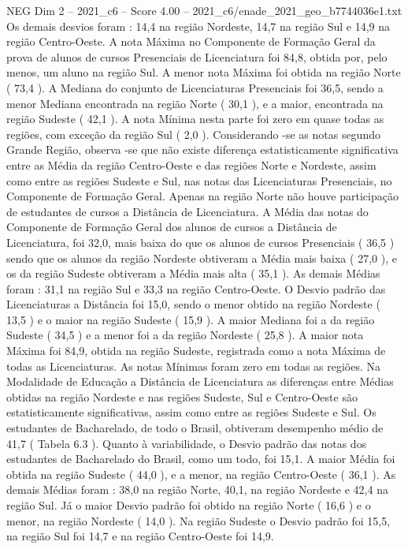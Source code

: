 \begin{textsample}{NEG Dim 2 – 2021\_c6 – Score 4.00 – 2021\_c6/enade\_2021\_geo\_b7744036e1.txt}
Os demais desvios foram : 14,4 na região Nordeste, 14,7 na região Sul e 14,9 na região Centro-Oeste.
A nota Máxima no Componente de Formação Geral da prova de alunos de cursos Presenciais de Licenciatura foi 84,8, obtida por, pelo menos, um aluno na região Sul.
A menor nota Máxima foi obtida na região Norte ( 73,4 ).
A Mediana do conjunto de Licenciaturas Presenciais foi 36,5, sendo a menor Mediana encontrada na região Norte ( 30,1 ), e a maior, encontrada na região Sudeste ( 42,1 ).
A nota Mínima nesta parte foi zero em quase todas as regiões, com exceção da região Sul ( 2,0 ).
Considerando -se as notas segundo Grande Região, observa -se que não existe diferença estatisticamente significativa entre as Média da região Centro-Oeste e das regiões Norte e Nordeste, assim como entre as regiões Sudeste e Sul, nas notas das Licenciaturas Presenciais, no Componente de Formação Geral.
Apenas na região Norte não houve participação de estudantes de cursos a Distância de Licenciatura.
A Média das notas do Componente de Formação Geral dos alunos de cursos a Distância de Licenciatura, foi 32,0, mais baixa do que os alunos de cursos Presenciais ( 36,5 ) sendo que os alunos da região Nordeste obtiveram a Média mais baixa ( 27,0 ), e os da região Sudeste obtiveram a Média mais alta ( 35,1 ).
As demais Médias foram : 31,1 na região Sul e 33,3 na região Centro-Oeste.
O Desvio padrão das Licenciaturas a Distância foi 15,0, sendo o menor obtido na região Nordeste ( 13,5 ) e o maior na região Sudeste ( 15,9 ).
A maior Mediana foi a da região Sudeste ( 34,5 ) e a menor foi a da região Nordeste ( 25,8 ).
A maior nota Máxima foi 84,9, obtida na região Sudeste, registrada como a nota Máxima de todas as Licenciaturas.
As notas Mínimas foram zero em todas as regiões.
Na Modalidade de Educação a Distância de Licenciatura as diferenças entre Médias obtidas na região Nordeste e nas regiões Sudeste, Sul e Centro-Oeste são estatisticamente significativas, assim como entre as regiões Sudeste e Sul.
Os estudantes de Bacharelado, de todo o Brasil, obtiveram desempenho médio de 41,7 ( Tabela 6.3 ).
Quanto à variabilidade, o Desvio padrão das notas dos estudantes de Bacharelado do Brasil, como um todo, foi 15,1.
A maior Média foi obtida na região Sudeste ( 44,0 ), e a menor, na região Centro-Oeste ( 36,1 ).
As demais Médias foram : 38,0 na região Norte, 40,1, na região Nordeste e 42,4 na região Sul.
Já o maior Desvio padrão foi obtido na região Norte ( 16,6 ) e o menor, na região Nordeste ( 14,0 ).
Na região Sudeste o Desvio padrão foi 15,5, na região Sul foi 14,7 e na região Centro-Oeste foi 14,9.

\end{textsample}
